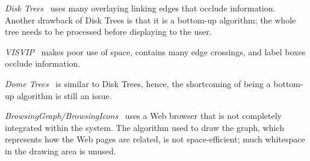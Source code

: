 \documentclass[]{article}
\begin{document}
{%
{\em Disk Trees}~\cite{cpmpg-98} uses many overlaying linking edges that occlude information.
Another drawback of Disk Trees is that it is a bottom-up algorithm;  the whole tree needs to be processed before displaying to the user.

{\em VISVIP}~\cite{cs-99} makes poor use of space, contains many edge crossings, and label boxes occlude information. 

{\em Dome Trees}~\cite{cpp-00} is similar to Disk Trees, hence, the shortcoming of being a bottom-up algorithm is still an issue.

{\em BrowsingGraph/BrowsingIcons}~\cite{m-00} uses a Web browser that is not completely integrated within the system.
The algorithm used to draw the graph, which represents how the Web pages are related, is not space-efficient; much whitespace in the drawing area is unused.

}
\end{document}
